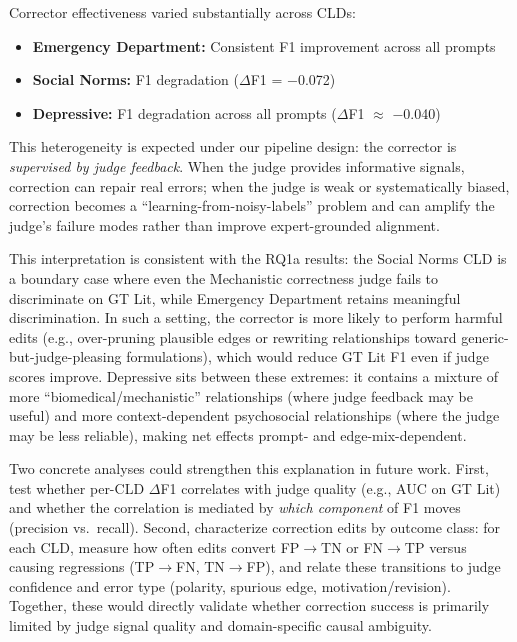 Corrector effectiveness varied substantially across CLDs:
\begin{itemize}[noitemsep]
    \item \textbf{Emergency Department:} Consistent F1 improvement across all prompts
    \item \textbf{Social Norms:} F1 degradation ($\Delta$F1 = $-$0.072)
    \item \textbf{Depressive:} F1 degradation across all prompts ($\Delta$F1 $\approx$ $-$0.040)
\end{itemize}

This heterogeneity is expected under our pipeline design: the corrector is \emph{supervised by judge feedback}. When the judge provides informative signals, correction can repair real errors; when the judge is weak or systematically biased, correction becomes a ``learning-from-noisy-labels'' problem and can amplify the judge's failure modes rather than improve expert-grounded alignment.

This interpretation is consistent with the RQ1a results: the Social Norms CLD is a boundary case where even the Mechanistic correctness judge fails to discriminate on GT Lit, while Emergency Department retains meaningful discrimination. In such a setting, the corrector is more likely to perform harmful edits (e.g., over-pruning plausible edges or rewriting relationships toward generic-but-judge-pleasing formulations), which would reduce GT Lit F1 even if judge scores improve. Depressive sits between these extremes: it contains a mixture of more ``biomedical/mechanistic'' relationships (where judge feedback may be useful) and more context-dependent psychosocial relationships (where the judge may be less reliable), making net effects prompt- and edge-mix-dependent.

Two concrete analyses could strengthen this explanation in future work. First, test whether per-CLD $\Delta$F1 correlates with judge quality (e.g., AUC on GT Lit) and whether the correlation is mediated by \emph{which component} of F1 moves (precision vs.\ recall). Second, characterize correction edits by outcome class: for each CLD, measure how often edits convert FP$\rightarrow$TN or FN$\rightarrow$TP versus causing regressions (TP$\rightarrow$FN, TN$\rightarrow$FP), and relate these transitions to judge confidence and error type (polarity, spurious edge, motivation/revision). Together, these would directly validate whether correction success is primarily limited by judge signal quality and domain-specific causal ambiguity.

